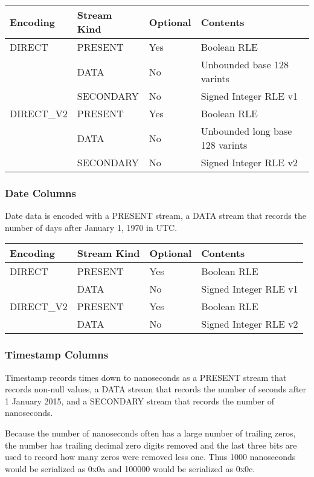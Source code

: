 \documentclass{article}
\begin{document}
\vspace{10pt}
\begin{tabular}{| l | l | l | l |}
\hline
Encoding & Stream Kind & Optional & Contents \\
\hline
DIRECT & PRESENT    & Yes & Boolean RLE\\
       & DATA       & No  & Unbounded base 128 varints\\
       & SECONDARY  & No  & Signed Integer RLE v1\\
\hline
DIRECT\_V2 & PRESENT   & Yes & Boolean RLE\\
          & DATA       & No  & Unbounded long base 128 varints\\
          & SECONDARY  & No  & Signed Integer RLE v2\\
\hline
\end{tabular}

\subsubsection{Date Columns}

Date data is encoded with a PRESENT stream, a DATA stream that records
the number of days after January 1, 1970 in UTC.

\vspace{10pt}
\begin{tabular}{| l | l | l | l |}
\hline
Encoding & Stream Kind & Optional & Contents \\
\hline
DIRECT & PRESENT & Yes & Boolean RLE\\
       & DATA    & No  & Signed Integer RLE v1\\
\hline
DIRECT\_V2 & PRESENT & Yes & Boolean RLE\\
           & DATA    & No  & Signed Integer RLE v2\\
\hline
\end{tabular}

\subsubsection{Timestamp Columns}

Timestamp records times down to nanoseconds as a PRESENT stream that
records non-null values, a DATA stream that records the number of
seconds after 1 January 2015, and a SECONDARY stream that records the
number of nanoseconds.

Because the number of nanoseconds often has a large number of trailing
zeros, the number has trailing decimal zero digits removed and the
last three bits are used to record how many zeros were removed less one. Thus
1000 nanoseconds would be serialized as 0x0a and 100000 would be
serialized as 0x0c.
\end{document}

